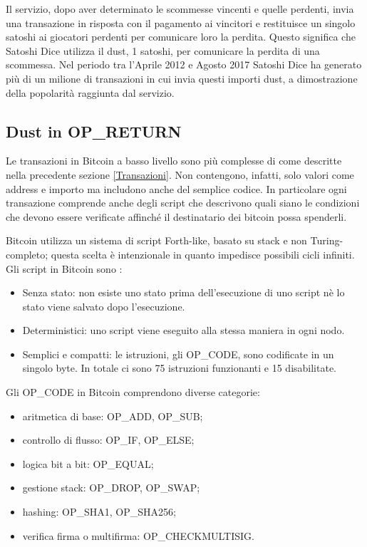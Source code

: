 Il servizio, dopo aver determinato le scommesse vincenti e quelle perdenti, invia una transazione in risposta con il pagamento ai vincitori e restituisce un singolo satoshi ai giocatori perdenti per comunicare loro la perdita. Questo significa che Satoshi Dice utilizza il dust, 1 satoshi, per comunicare la perdita di una scommessa. Nel periodo tra l'Aprile 2012 e Agosto 2017 Satoshi Dice ha generato più di un milione di transazioni in cui invia questi importi dust, a dimostrazione della popolarità raggiunta dal servizio.

\subsection{Dust in OP\_RETURN}
Le transazioni in Bitcoin a basso livello sono più complesse \cite{script} di come descritte nella precedente sezione \ref{Transazioni}. Non contengono, infatti, solo valori come address e importo ma includono anche del semplice codice. In particolare ogni transazione comprende anche degli script che descrivono quali siano le condizioni che devono essere verificate affinché il destinatario dei bitcoin possa spenderli. 

Bitcoin utilizza un sistema di script Forth-like, basato su stack e non Turing-completo; questa scelta è intenzionale in quanto impedisce possibili cicli infiniti. Gli script in Bitcoin sono \cite{opcode}:
\begin{itemize}
    \item Senza stato: non esiste uno stato prima dell'esecuzione di uno script nè lo stato viene salvato dopo l'esecuzione.
    \item Deterministici: uno script viene eseguito alla stessa maniera in ogni nodo.
    \item Semplici e compatti: le istruzioni, gli OP\_CODE, sono codificate in un singolo byte. In totale ci sono 75 istruzioni funzionanti e 15 disabilitate.
\end{itemize}
Gli OP\_CODE in Bitcoin comprendono diverse categorie:
\begin{itemize}
    \item aritmetica di base: OP\_ADD, OP\_SUB;
    \item controllo di flusso: OP\_IF, OP\_ELSE;
    \item logica bit a bit: OP\_EQUAL;
    \item gestione stack: OP\_DROP, OP\_SWAP;
    \item hashing: OP\_SHA1, OP\_SHA256;
    \item verifica firma o multifirma: OP\_CHECKMULTISIG.
\end{itemize}


